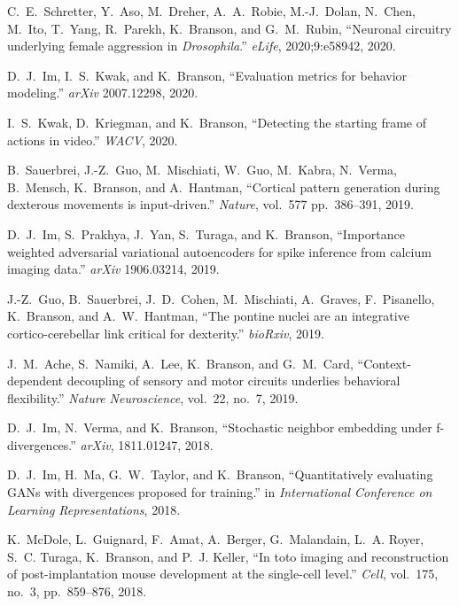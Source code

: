 \begin{cvenum}
\item C.~E.~Schretter, Y.~Aso, M.~Dreher, A.~A.~Robie, M.-J.~Dolan, N.~Chen, M.~Ito, T.~Yang, R.~Parekh, K.~Branson, and G.~M.~Rubin, ``Neuronal circuitry underlying female aggression in {\em {{D}}rosophila}.'' {\em eLife}, 2020;9:e58942, 2020.
  
\item D.~J.~Im, I.~S.~Kwak, and K.~Branson, ``Evaluation metrics for behavior modeling.'' {\em arXiv} 2007.12298, 2020.
  
\item I.~S.~Kwak, D.~Kriegman, and K.~Branson, ``Detecting the starting frame of actions in video.'' {\em WACV}, 2020.

\item B.~Sauerbrei, J.-Z.~Guo, M.~Mischiati, W.~Guo, M.~Kabra, N.~Verma, B.~Mensch, K.~Branson, and A.~Hantman, ``Cortical pattern generation during dexterous movements is input-driven.'' {\em Nature}, vol.~577 pp.~386--391, 2019.

\item D.~J.~Im, S.~Prakhya, J.~Yan, S.~Turaga, and K.~Branson, ``Importance weighted
  adversarial variational autoencoders for spike inference from calcium imaging
  data.'' {\em arXiv} 1906.03214, 2019.

\item J.-Z.~Guo, B.~Sauerbrei, J.~D.~Cohen, M.~Mischiati, A.~Graves, F.~Pisanello,
  K.~Branson, and A.~W.~Hantman, ``The pontine nuclei are an integrative
  cortico-cerebellar link critical for dexterity.'' {\em bioRxiv}, 2019.

\item J.~M.~Ache, S.~Namiki, A.~Lee, K.~Branson, and G.~M.~Card, ``Context-dependent
  decoupling of sensory and motor circuits underlies behavioral flexibility.''
  {\em Nature Neuroscience}, vol.~22, no.~7, 2019.

\item D.~J.~Im, N.~Verma, and K.~Branson, ``Stochastic neighbor embedding under
  f-divergences.'' {\em arXiv}, 1811.01247, 2018.

\item D.~J.~Im, H.~Ma, G.~W.~Taylor, and K.~Branson,
  ``Quantitatively evaluating {GAN}s with divergences proposed for training.''
  in {\em International Conference on Learning Representations},
  2018.

\item K.~McDole, L.~Guignard, F.~Amat, A.~Berger, G.~Malandain, L.~A. Royer, S.~C.
  Turaga, K.~Branson, and P.~J. Keller, ``In toto imaging and reconstruction of
  post-implantation mouse development at the single-cell level.'' {\em Cell},
  vol.~175, no.~3, pp.~859--876, 2018.


\end{cvenum}

